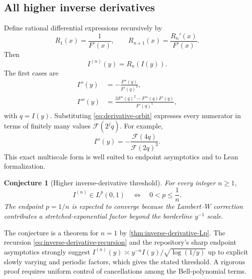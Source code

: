\documentclass[11pt]{article}
\newtheorem{conjecture}[theorem]{Conjecture}
\theoremstyle{definition}
\theoremstyle{remark}
\newcommand{\FF}{\mathscr F}
\begin{document}
\subsection{All higher inverse derivatives}

Define rational differential expressions recursively by
\begin{equation}
 R_1(x)=\frac1{F'(x)},\qquad
 R_{n+1}(x)=\frac{R_n'(x)}{F'(x)}.                         \label{eq:inverse-derivative-recursion}
\end{equation}
Then
\begin{equation}
 I^{(n)}(y)=R_n(I(y)).                                     \label{eq:inverse-derivative-all}
\end{equation}
The first cases are
\begin{align}
 I''(y)&=-\frac{F''(q)}{F'(q)^3},                          \label{eq:Isecond}\\
 I'''(y)&=\frac{3F''(q)^2-F'''(q)F'(q)}{F'(q)^5},          \label{eq:Ithird}
\end{align}
with \(q=I(y)\).  Substituting \eqref{eq:derivative-orbit} expresses every numerator
in terms of finitely many values \(\FF(2^jq)\).  For example,
\begin{equation}
 I''(y)=-\frac{\FF(4q)}{\FF(2q)^3}.                       \label{eq:Isecond-scaled}
\end{equation}
This exact multiscale form is well suited to endpoint asymptotics and to Lean
formalization.

\begin{conjecture}[Higher inverse-derivative threshold]
\label{conj:higher-inverse-Lp}
For every integer \(n\ge1\),
\begin{equation}
 I^{(n)}\in L^p(0,1)
 \quad\Longleftrightarrow\quad 0<p\le\frac1n.             \label{eq:higher-I-threshold}
\end{equation}
The endpoint \(p=1/n\) is expected to converge because the Lambert--\(W\) correction
contributes a stretched-exponential factor beyond the borderline \(y^{-1}\) scale.
\end{conjecture}

The conjecture is a theorem for \(n=1\) by \cref{thm:inverse-derivative-Lp}.  The
recursion \eqref{eq:inverse-derivative-recursion} and the repository's sharp endpoint
asymptotics strongly suggest
\(
 I^{(n)}(y)\asymp y^{-n}I(y)/\sqrt{\log(1/y)}
\)
up to explicit slowly varying and periodic factors, which gives the stated threshold.
A rigorous proof requires uniform control of cancellations among the Bell-polynomial
terms.
\end{document}

